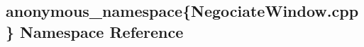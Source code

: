 \hypertarget{namespaceanonymous__namespace_02NegociateWindow_8cpp_03}{\subsection{anonymous\-\_\-namespace\{Negociate\-Window.\-cpp\} Namespace Reference}
\label{namespaceanonymous__namespace_02NegociateWindow_8cpp_03}
}
